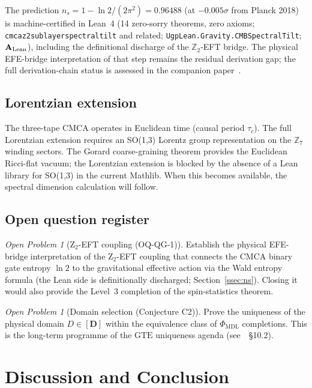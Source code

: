 \documentclass[11pt]{article}
\theoremstyle{remark}
\newtheorem{openprob}[theorem]{Open Problem}
\newcommand{\GTE}{\text{GTE}}
\newcommand{\PHIMDL}{\Phi_{\mathrm{MDL}}}
\newcommand{\ZS}{\mathbb{Z}_7}
\newcommand{\lean}[1]{%
  \penalty-100
  \begingroup\def\_{\textunderscore\allowbreak}\texttt{#1}\endgroup}
\newcommand{\CatAL}{\ensuremath{\textbf{A}_{\rm Lean}}}
\begin{document}
The prediction $n_s = 1 - \ln 2/(2\pi^2) = 0.96488$ (at $-0.005\sigma$ from
Planck 2018) is machine-certified in Lean~4 (14 zero-sorry theorems,
zero axioms; \lean{cmca\_z2\_sublayer\allowbreak\_spectral\_tilt} and related;
\lean{UgpLean.Gravity.CMBSpectralTilt}; $\CatAL$), including the definitional
discharge of the $\mathbb{Z}_2$-EFT bridge.  The physical EFE-bridge
interpretation of that step remains the residual derivation gap; the full
derivation-chain status is assessed in the companion paper~\cite{SpivackQGR}.

\subsection{Lorentzian extension}
\label{ssec:lorentzian}

The three-tape CMCA operates in Euclidean time (causal period $\tau_c$). The
full Lorentzian extension requires an SO(1,3) Lorentz group representation on
the $\ZS$ winding sectors. The Gorard coarse-graining theorem provides the
Euclidean Ricci-flat vacuum; the Lorentzian extension is blocked by the absence
of a Lean library for SO(1,3) in the current Mathlib. When this becomes available,
the spectral dimension calculation will follow.

\subsection{Open question register}
\label{ssec:oq}

\begin{openprob}[Z$_2$-EFT coupling (OQ-QG-1)]
Establish the physical EFE-bridge interpretation of the Z$_2$-EFT coupling that
connects the CMCA binary gate entropy $\ln 2$ to the gravitational effective
action via the Wald entropy formula (the Lean side is definitionally discharged;
Section~\ref{ssec:ns}).  Closing it would also provide the Level~3 completion
of the spin-statistics theorem.
\end{openprob}

\begin{openprob}[Domain selection (Conjecture C2)]
Prove the uniqueness of the physical domain $D\in[\mathbf{D}]$ within the
equivalence class of $\PHIMDL$ completions. This is the long-term programme
of the $\GTE$ uniqueness agenda (see~\cite{SpivackPhiMDLField}~§10.2).
\end{openprob}

\section{Discussion and Conclusion}
\label{sec:conclusion}
\end{document}
